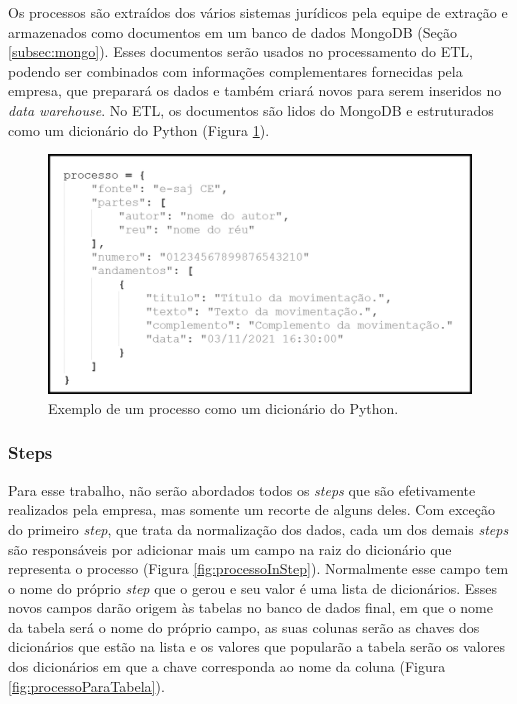 Os processos são extraídos dos vários sistemas jurídicos pela equipe de extração e armazenados como documentos em um banco de dados MongoDB (Seção \ref{subsec:mongo}). Esses documentos serão usados no processamento do ETL, podendo ser combinados com informações complementares fornecidas pela empresa, que preparará os dados e também criará novos para serem inseridos no \textit{data warehouse}. No ETL, os documentos são lidos do MongoDB e estruturados como um dicionário do Python (Figura \ref{fig:processoPython}).

\begin{figure}[ht]
\centering
\includegraphics[width=1\textwidth]{imagens/processo-python.png}
\caption{Exemplo de um processo como um dicionário do Python.}
\label{fig:processoPython}
\end{figure}


\subsubsection{Steps}
\label{subsec:steps}

Para esse trabalho, não serão abordados todos os \textit{steps} que são efetivamente realizados pela empresa, mas somente um recorte de alguns deles. Com exceção do primeiro \textit{step}, que trata da normalização dos dados, cada um dos demais \textit{steps} são responsáveis por adicionar mais um campo na raiz do dicionário que representa o processo (Figura \ref{fig:processoInStep}). Normalmente esse campo tem o nome do próprio \textit{step} que o gerou e seu valor é uma lista de dicionários. Esses novos campos darão origem às tabelas no banco de dados final, em que o nome da tabela será o nome do próprio campo, as suas colunas serão as chaves dos dicionários que estão na lista e os valores que popularão a tabela serão os valores dos dicionários em que a chave corresponda ao nome da coluna (Figura \ref{fig:processoParaTabela}).

